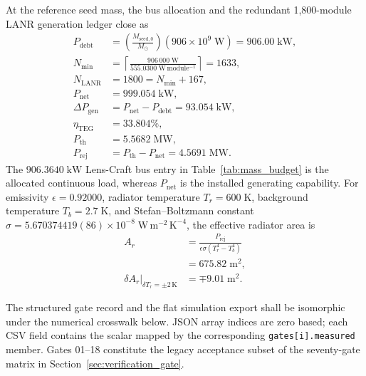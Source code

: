 \documentclass[10pt,twocolumn]{IEEEtran}
\newcommand{\Msun}{M_{\odot}}
\begin{document}
At the reference seed mass, the bus allocation and the redundant 1,800-module LANR generation ledger close as
\begin{equation}
\begin{aligned}
P_{\mathrm{debt}} &= \left(\frac{M_{\mathrm{seed},0}}{\Msun}\right)
\left(906\times10^{9}\;\mathrm{W}\right)
=906.00\;\mathrm{kW}, \\
N_{\mathrm{min}} &= \left\lceil\frac{906\,000\;\mathrm{W}}
{555.0300\;\mathrm{W\,module^{-1}}}\right\rceil=1633, \\
N_{\mathrm{LANR}} &=1800=N_{\mathrm{min}}+167, \\
P_{\mathrm{net}} &=999.054\;\mathrm{kW}, \\
\Delta P_{\mathrm{gen}} &=P_{\mathrm{net}}-P_{\mathrm{debt}}
=93.054\;\mathrm{kW}, \\
\eta_{\mathrm{TEG}} &=33.804\%, \\
P_{\mathrm{th}} &=5.5682\;\mathrm{MW}, \\
P_{\mathrm{rej}} &=P_{\mathrm{th}}-P_{\mathrm{net}}
=4.5691\;\mathrm{MW}.
\end{aligned}
\label{eq:power_closure}
\end{equation}
The $906.3640\;\mathrm{kW}$ Lens-Craft bus entry in Table~\ref{tab:mass_budget} is the allocated continuous load, whereas $P_{\mathrm{net}}$ is the installed generating capability. For emissivity $\epsilon=0.92000$, radiator temperature $T_r=600\;\mathrm{K}$, background temperature $T_b=2.7\;\mathrm{K}$, and Stefan--Boltzmann constant $\sigma=5.670374419(86)\times10^{-8}\;\mathrm{W\,m^{-2}\,K^{-4}}$, the effective radiator area is
\begin{equation}
\begin{aligned}
A_r &= \frac{P_{\mathrm{rej}}}{\epsilon\sigma\left(T_r^4-T_b^4\right)} \\
&= 675.82\;\mathrm{m^2}, \\
\delta A_r\big|_{\delta T_r=\pm2\,\mathrm{K}}
&= \mp9.01\;\mathrm{m^2}.
\end{aligned}
\label{eq:radiator}
\end{equation}

The structured gate record and the flat simulation export shall be isomorphic under the numerical crosswalk below. JSON array indices are zero based; each CSV field contains the scalar mapped by the corresponding \texttt{gates[i].measured} member. Gates 01--18 constitute the legacy acceptance subset of the seventy-gate matrix in Section~\ref{sec:verification_gate}.
\end{document}
